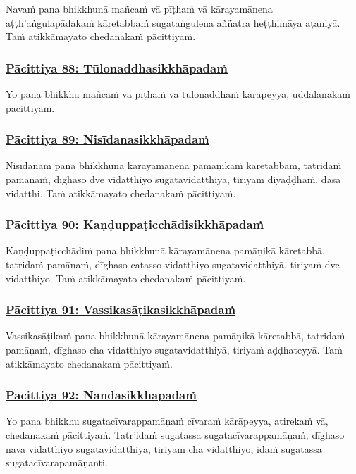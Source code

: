 Navaṁ pana bhikkhunā mañcaṁ vā pīṭhaṁ vā kārayamānena aṭṭh'aṅgulapādakaṁ kāretabbaṁ sugataṅgulena aññatra heṭṭhimāya aṭaniyā. Taṁ atikkāmayato chedanakaṁ pācittiyaṁ.

\subsubsection*{\hyperref[exp88]{Pācittiya 88: Tūlonaddhasikkhāpadaṁ}}
\label{pac88}

Yo pana bhikkhu mañcaṁ vā pīṭhaṁ vā tūlonaddhaṁ kārāpeyya, uddālanakaṁ pācittiyaṁ.

\subsubsection*{\hyperref[exp89]{Pācittiya 89: Nisīdanasikkhāpadaṁ}}
\label{pac89}

Nisīdanaṁ pana bhikkhunā kārayamānena pamāṇikaṁ kāretabbaṁ, tatridaṁ pamāṇaṁ, dīghaso dve vidatthiyo sugatavidatthiyā, tiriyaṁ diyaḍḍhaṁ, dasā vidatthi. Taṁ atikkāmayato chedanakaṁ pācittiyaṁ.

\subsubsection*{\hyperref[exp90]{Pācittiya 90: Kaṇḍuppaṭicchādisikkhāpadaṁ}}
\label{pac90}

Kaṇḍuppaṭicchādiṁ pana bhikkhunā kārayamānena pamāṇikā kāretabbā, tatridaṁ pamāṇaṁ, dīghaso catasso vidatthiyo sugatavidatthiyā, tiriyaṁ dve vidatthiyo. Taṁ atikkāmayato chedanakaṁ pācittiyaṁ.

\subsubsection*{\hyperref[exp91]{Pācittiya 91: Vassikasāṭikasikkhāpadaṁ}}
\label{pac91}

Vassikasāṭikaṁ pana bhikkhunā kārayamānena pamāṇikā kāretabbā, tatridaṁ pamāṇaṁ, dīghaso cha vidatthiyo sugatavidatthiyā, tiriyaṁ aḍḍhateyyā. Taṁ atikkāmayato chedanakaṁ pācittiyaṁ.

\subsubsection*{\hyperref[exp92]{Pācittiya 92: Nandasikkhāpadaṁ}}
\label{pac92}
Yo pana bhikkhu sugatacīvarappamāṇaṁ cīvaraṁ kārāpeyya, atirekaṁ vā, chedanakaṁ pācittiyaṁ. Tatr'idaṁ sugatassa sugatacīvarappamāṇaṁ, dīghaso nava vidatthiyo sugatavidatthiyā, tiriyaṁ cha vidatthiyo, idaṁ sugatassa sugatacīvarapamāṇanti.

